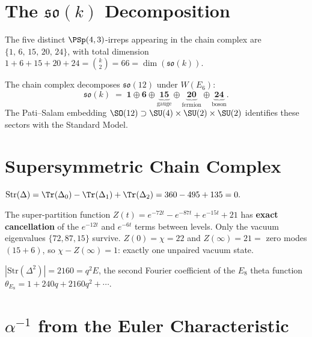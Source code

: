 \section{\texorpdfstring{The $\mathfrak{so}(k)$ Decomposition}{The so(k) Decomposition}}

\begin{theorem}
The five distinct $\PSp(4,3)$-irreps appearing in the chain complex
are $\{1,\,6,\,15,\,20,\,24\}$, with total dimension
$1+6+15+20+24 = \binom{k}{2} = 66 = \dim(\mathfrak{so}(k))$.
\end{theorem}

The chain complex decomposes $\mathfrak{so}(12)$ under $W(E_6)$:
\begin{equation}
\mathfrak{so}(k) \;=\; \mathbf{1} \oplus \mathbf{6} \oplus
\underbrace{\mathbf{15}}_{\mathrm{gauge}} \oplus
\underbrace{\mathbf{20}}_{\mathrm{fermion}} \oplus
\underbrace{\mathbf{24}}_{\mathrm{boson}}.
\end{equation}
The Pati--Salam embedding $\SO(12)\supset\SU(4)\times\SU(2)\times\SU(2)$
identifies these sectors with the Standard Model.


\section{Supersymmetric Chain Complex}

\begin{theorem}
$\mathrm{Str}(\Delta) = \Tr(\Delta_0) - \Tr(\Delta_1) + \Tr(\Delta_2)
= 360 - 495 + 135 = 0.$
\end{theorem}

The super-partition function
$Z(t) = e^{-72t} - e^{-87t} + e^{-15t} + 21$
has \textbf{exact cancellation} of the $e^{-12t}$ and $e^{-6t}$ terms
between levels. Only the vacuum eigenvalues $\{72,87,15\}$ survive.
$Z(0) = \chi = 22$ and $Z(\infty) = 21 = $ zero modes $(15+6)$,
so $\chi - Z(\infty) = 1$: exactly one unpaired vacuum state.

\begin{theorem}
$|\mathrm{Str}(\Delta^2)| = 2160 = q^2 E$, the second Fourier coefficient
of the $E_8$ theta function $\theta_{E_8} = 1 + 240q + 2160q^2 + \cdots$.
\end{theorem}


\section{\texorpdfstring{$\alpha^{-1}$ from the Euler Characteristic}{alpha-inverse from the Euler Characteristic}}

